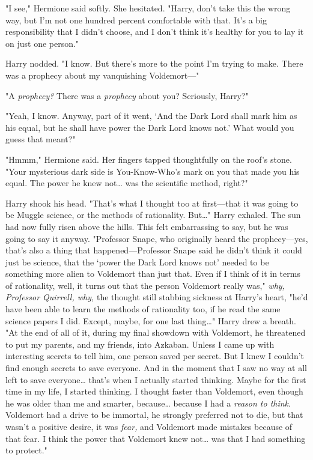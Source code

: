 "I see," Hermione said softly. She hesitated. "Harry, don't take this the wrong
way, but I'm not one hundred percent comfortable with that. It's a big
responsibility that I didn't choose, and I don't think it's healthy for you to
lay it on just one person."

Harry nodded. "I know. But there's more to the point I'm trying to make. There
was a prophecy about my vanquishing Voldemort---"

"A \emph{prophecy?} There was a \emph{prophecy} about you? Seriously, Harry?"

"Yeah, I know. Anyway, part of it went, `And the Dark Lord shall mark him as
his equal, but he shall have power the Dark Lord knows not.' What would you
guess that meant?"

"Hmmm," Hermione said. Her fingers tapped thoughtfully on the roof's stone.
"Your mysterious dark side is You-Know-Who's mark on you that made you his
equal. The power he knew not{\ldots} was the scientific method, right?"

Harry shook his head. "That's what I thought too at first---that it was going
to be Muggle science, or the methods of rationality. But{\ldots}" Harry
exhaled. The sun had now fully risen above the hills. This felt embarrassing to
say, but he was going to say it anyway. "Professor Snape, who originally heard
the prophecy---yes, that's also a thing that happened---Professor Snape said he
didn't think it could just be science, that the `power the Dark Lord knows not'
needed to be something more alien to Voldemort than just that. Even if I think
of it in terms of rationality, well, it turns out that the person Voldemort
really was," \emph{why, Professor Quirrell, why,} the thought still stabbing
sickness at Harry's heart, "he'd have been able to learn the methods of
rationality too, if he read the same science papers I did. Except, maybe, for
one last thing{\ldots}" Harry drew a breath. "At the end of all of it, during
my final showdown with Voldemort, he threatened to put my parents, and my
friends, into Azkaban. Unless I came up with interesting secrets to tell him,
one person saved per secret. But I knew I couldn't find enough secrets to save
everyone. And in the moment that I saw no way at all left to save
everyone{\ldots} that's when I actually started thinking. Maybe for the first
time in my life, I started thinking. I thought faster than Voldemort, even
though he was older than me and smarter, because{\ldots} because I had a
\emph{reason to think}. Voldemort had a drive to be immortal, he strongly
preferred not to die, but that wasn't a positive desire, it was \emph{fear,}
and Voldemort made mistakes because of that fear. I think the power that
Voldemort knew not{\ldots} was that I had something to protect."

